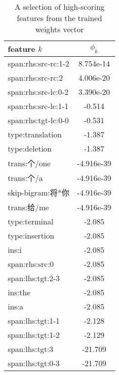 \documentclass[11pt, a4paper]{article}
\begin{document}

\begin{table}
\begin{center}
\begin{tabular}{ |l|c| } 
\hline
feature $k$ & $\phi_k$ \\ 
\hline
span:rhs:src-rc:1-2 &   8.754e-14 \\
span:rhs:src-rc:2   &   4.006e-20 \\
span:rhs:src-lc:0-2 &   3.390e-20 \\
span:rhs:src-lc:1-1 &   -0.514 \\
span:rhs:tgt-lc:0-0 &   -0.531 \\
type:translation    &   -1.387 \\
type:deletion       &   -1.387 \\
trans:个/one         &-4.916e-39 \\
trans:个/a           & -4.916e-39 \\
skip-bigram:将*你    & -4.916e-39 \\
trans:给/me          & -4.916e-39 \\
type:terminal       &   -2.085 \\
type:insertion      &   -2.085 \\
ins:i               &   -2.085 \\
span:rhs:src:0      &   -2.085 \\
span:lhs:tgt:2-3    &   -2.085 \\
ins:the             &   -2.085 \\
ins:a               &   -2.085 \\
span:lhs:tgt:1-1    &   -2.128 \\
span:lhs:tgt:1-2    &   -2.129 \\
span:lhs:tgt:3      &   -21.709 \\
span:lhs:tgt:0-3    &   -21.709 \\
\hline
\end{tabular}
\end{center}
\caption{A selection of high-scoring features from the trained weights vector}
\label{table:features}
\end{table}
\end{document}

